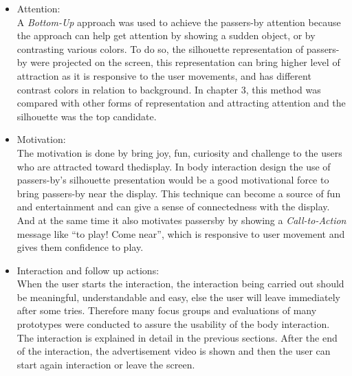 \begin{itemize}

\item Attention: \\
A \emph{Bottom-Up} approach was used to achieve the passers-by attention because the approach can help get attention by showing a sudden object, or by contrasting various colors. To do so, the silhouette representation of passers-by were projected on the screen, this representation can bring higher level of attraction as it is responsive to the user movements, and has different contrast colors in relation to background. In chapter 3, this method was compared with other forms of representation and attracting attention and the silhouette was the top candidate.

\item Motivation: \\
The motivation is done by bring joy, fun, curiosity and challenge\cite{ toward_motivation} to the users who are attracted toward thedisplay. In body interaction design the use of passers-by’s silhouette presentation would be a good motivational force to bring passers-by near the display. This technique can become a source of fun and entertainment and can give a sense of connectedness with the display. And at the same time it also motivates passersby by showing a \emph{Call-to-Action} message like “to play! Come near”, which is responsive to user movement and gives them confidence to play.

\item Interaction and follow up actions: \\
When the user starts the interaction, the interaction being carried out should be meaningful, understandable and easy, else the user will leave immediately after some tries. Therefore many focus groups and evaluations of many prototypes were conducted to assure the usability of the body interaction. The interaction is explained in detail in the previous sections.
After the end of the interaction, the advertisement video is shown and then the user can start again interaction or leave the screen.
\end{itemize}


